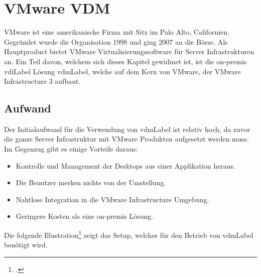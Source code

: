 \newpage
\section{VMware VDM}
VMware ist eine amerikanische Firma mit Sitz im Palo Alto, Californien. Gegründet wurde die Organisation 1998 und ging 2007 an die Börse.
Als Hauptproduct bietet VMware Virtualisierungssoftware für Server Infrastrukturen an. Ein Teil davon, welchem sich dieses Kapitel gewidmet ist, ist die on-premis \Gls{vdiLabel} Lösung \Gls{vdmLabel}, welche auf dem Kern von VMware, der VMware Infrastructure 3 aufbaut.

\subsection{Aufwand}
Der Initialaufwand für die Verwendung von \Gls{vdmLabel} ist relativ hoch, da zuvor die ganze Server Infrastruktur mit VMware Produkten aufgesetzt werden muss.
Im Gegenzug gibt es einige Vorteile daraus:
\begin{itemize}
	\item Kontrolle und Management der Desktops aus einer Applikation heraus.
	\item Die Benutzer merken nichts von der Umstellung.
	\item Nahtlose Integration in die VMware Infrastructure Umgebung.
	\item Geringere Kosten als eine on-premis Lösung.
\end{itemize}

Die folgende Illustration\footcite{Introduction_to_Virtual_Desktop_Manager} zeigt das Setup, welches für den Betrieb von \Gls{vdmLabel} benötigt wird.

